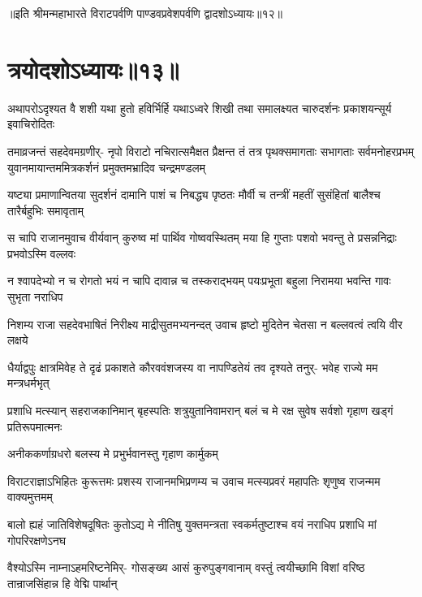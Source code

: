 ॥इति श्रीमन्महाभारते विराटपर्वणि पाण्डवप्रवेशपर्वणि द्वादशोऽध्यायः॥१२॥

\chapter{त्रयोदशोऽध्यायः॥१३॥}

\fourlineindentedshloka
{अथापरोऽदृश्यत वै शशी यथा}
{हुतो हविर्भिर्हि यथाऽध्वरे शिखी}
{तथा समालक्ष्यत चारुदर्शनः}
{प्रकाशयन्सूर्य इवाचिरोदितः}


\sixlineindentedshloka
{तमाव्रजन्तं सहदेवमग्रणीर्-}
{नृपो विराटो नचिरात्समैक्षत}
{प्रैक्षन्त तं तत्र पृथक्समागताः}
{सभागताः सर्वमनोहरप्रभम्}
{युवानमायान्तममित्रकर्शनं}
{प्रमुक्तमभ्रादिव चन्द्रमण्डलम्}


\fourlineindentedshloka
{यष्ट्या प्रमाणान्वितया सुदर्शनं}
{दामानि पाशं च निबद्ध्य पृष्ठतः}
{मौर्वी च तन्त्रीं महतीं सुसंहितां}
{बालैश्च तारैर्बहुभिः समावृताम्}


\fourlineindentedshloka
{स चापि राजानमुवाच वीर्यवान्}
{कुरुष्व मां पार्थिव गोष्ववस्थितम्}
{मया हि गुप्ताः पशवो भवन्तु ते}
{प्रसन्ननिद्राः प्रभवोऽस्मि वल्लवः}


\fourlineindentedshloka
{न श्वापदेभ्यो न च रोगतो भयं}
{न चापि दावान्न च तस्कराद्भयम्}
{पयःप्रभूता बहुला निरामया}
{भवन्ति गावः सुभृता नराधिप}


\fourlineindentedshloka
{निशम्य राजा सहदेवभाषितं}
{निरीक्ष्य माद्रीसुतमभ्यनन्दत्}
{उवाच हृष्टो मुदितेन चेतसा}
{न बल्लवत्वं त्वयि वीर लक्षये}


\fourlineindentedshloka
{धैर्याद्वपुः क्षात्रमिवेह ते दृढं}
{प्रकाशते कौरववंशजस्य वा}
{नापण्डितेयं तव दृश्यते तनुर्-}
{भवेह राज्ये मम मन्त्रधर्मभृत्}


\fourlineindentedshloka
{प्रशाधि मत्स्यान् सहराजकानिमान्}
{बृहस्पतिः शत्रुयुतानिवामरान्}
{बलं च मे रक्ष सुवेष सर्वशो}
{गृहाण खड्गं प्रतिरूपमात्मनः}


\onelineindentedshloka
{अनीककर्णाग्रधरो बलस्य मे}
{प्रभुर्भवानस्तु गृहाण कार्मुकम्}



\fourlineindentedshloka
{विराटराज्ञाऽभिहितः कुरूत्तमः}
{प्रशस्य राजानमभिप्रणम्य च}
{उवाच मत्स्यप्रवरं महापतिः}
{शृणुष्व राजन्मम वाक्यमुत्तमम्}


\fourlineindentedshloka
{बालो ह्यहं जातिविशेषदूषितः}
{कुतोऽद्य मे नीतिषु युक्तमन्त्रता}
{स्वकर्मतुष्टाश्च वयं नराधिप}
{प्रशाधि मां गोपरिरक्षणेऽनघ}


\fourlineindentedshloka
{वैश्योऽस्मि नाम्नाऽहमरिष्टनेमिर्-}
{गोसङ्ख्य आसं कुरुपुङ्गवानाम्}
{वस्तुं त्वयीच्छामि विशां वरिष्ठ}
{तान्राजसिंहान्न हि वेद्मि पार्थान्}


